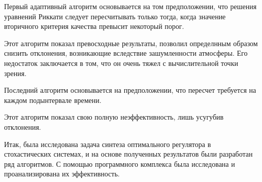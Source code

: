 \documentclass[12pt,a4paper,legalpaper,pdftex]{letter}
\begin{document}
Первый адаптивный алгоритм основывается на том предположении, что решения уравнений Риккати следует пересчитывать только тогда, когда значение вторичного критерия качества превысит некоторый порог.



Этот алгоритм показал превосходные результаты, позволил определнным образом снизить отклонения, возникающие вследствие зашумленности атмосферы. Его недостаток заключается в том, что он очень тяжел с вычислительной точки зрения.



Последний алгоритм основывается на предположении, что пересчет требуется на каждом подынтервале времени.



Этот алгоритм показал свою полную неэффективность, лишь усугубив отклонения.



Итак, была исследована задача синтеза оптимального регулятора в стохастических системах, и на основе полученных результатов были разработан ряд алгоритмов. С помощью программного комплекса была исследована и проанализирована их эффективность.
\end{document}
